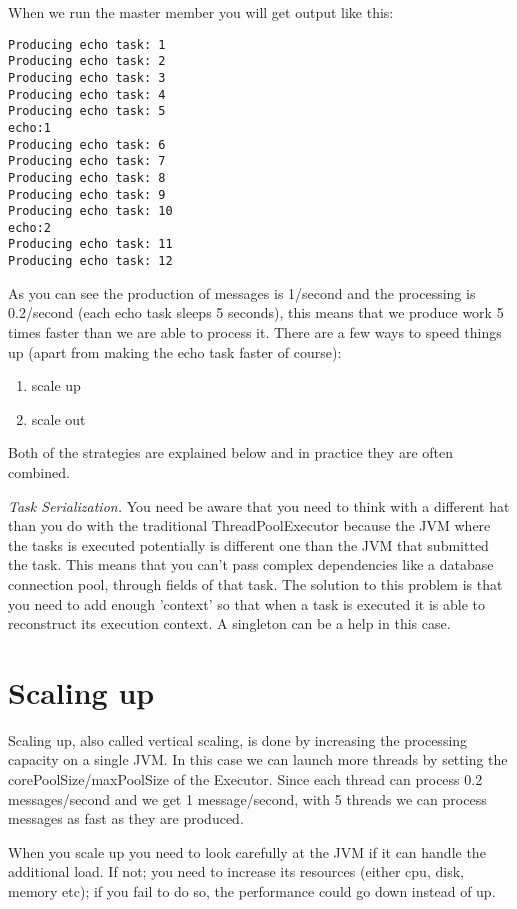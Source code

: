 When we run the master member you will get output like this:
\begin{lstlisting}
Producing echo task: 1
Producing echo task: 2
Producing echo task: 3
Producing echo task: 4
Producing echo task: 5
echo:1
Producing echo task: 6
Producing echo task: 7
Producing echo task: 8
Producing echo task: 9
Producing echo task: 10
echo:2
Producing echo task: 11
Producing echo task: 12	
\end{lstlisting}
As you can see the production of messages is 1/second and the processing is 0.2/second (each echo task sleeps 5 seconds), this means that we produce work 5 times faster than we are able to process it. There are a few ways to speed things up (apart from making the echo task faster of course):
\begin{enumerate}
\item scale up 
\item scale out
\end{enumerate}
Both of the strategies are explained below and in practice they are often combined. 

\emph{Task Serialization.} You need be aware that you need to think with a different hat than you do with the traditional ThreadPoolExecutor because the JVM where the tasks is executed potentially is different one than the JVM that submitted the task. This means that you can't pass complex dependencies like a database connection pool, through fields of that task. The solution to this problem is that you need to add enough 'context' so that when a task is executed it is able to reconstruct its execution context. A singleton can be a help in this case.

\section{Scaling up}
Scaling up, also called vertical scaling, is done by increasing the processing capacity on a single JVM. In this case we can launch more threads by setting the corePoolSize/maxPoolSize of the Executor. Since each thread can process 0.2 messages/second and we get 1 message/second, with 5 threads we can process messages as fast as they are produced.

When you scale up you need to look carefully at the JVM if it can handle the additional load. If not; you need to increase its resources (either cpu, disk, memory etc); if you fail to do so, the performance could go down instead of up. 

